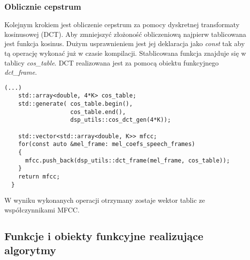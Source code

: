 \subsubsection{Oblicznie cepstrum}

Kolejnym krokiem jest obliczenie cepstrum za pomocy dyskretnej transformaty kosinusowej (DCT). Aby zmniejszyć złożoność obliczeniową najpierw tablicowana jest funkcja kosinus. Dużym usprawnieniem jest jej deklaracja jako \textit{const} tak aby tą operację wykonać już w czasie kompilacji. Stablicowana funkcja znajduje się w tablicy \textit{cos\_table}. DCT realizowana jest za pomocą obiektu funkcyjnego \textit{dct\_frame}.
    
\begin{lstlisting}[style=lst:cpp, caption=funkcja \textit{mfcc\_extraction} - obliczanie cepstrum \label{lst:mfcccepstrum}]
    (...)
    std::array<double, 4*K> cos_table;
    std::generate( cos_table.begin(),
                   cos_table.end(),
                   dsp_utils::cos_dct_gen(4*K));

    std::vector<std::array<double, K>> mfcc;
    for(const auto &mel_frame: mel_coefs_speech_frames)
    {
      mfcc.push_back(dsp_utils::dct_frame(mel_frame, cos_table));
    }
    return mfcc;
  }
\end{lstlisting}

W wyniku wykonanych operacji otrzymany zostaje wektor tablic ze współczynnikami MFCC.

\subsection{Funkcje i obiekty funkcyjne realizujące algorytmy}

